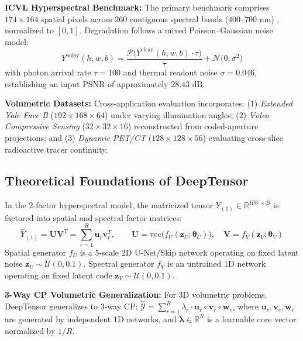 \textbf{ICVL Hyperspectral Benchmark:} The primary benchmark comprises $174 \times 164$ spatial pixels across $260$ contiguous spectral bands ($400\text{--}700\text{ nm}$) \citep{arad2016sparse}, normalized to $[0, 1]$. Degradation follows a mixed Poisson--Gaussian noise model:
\begin{equation}
\label{eq:noise_model}
Y^\text{noisy}(h, w, b) = \frac{\mathcal{P}\big(Y^\text{clean}(h, w, b) \cdot \tau\big)}{\tau} + \mathcal{N}\big(0, \sigma^2\big)
\end{equation}
with photon arrival rate $\tau = 100$ and thermal readout noise $\sigma = 0.046$, establishing an input PSNR of approximately $28.43\text{ dB}$.

\textbf{Volumetric Datasets:} Cross-application evaluation incorporates: (1) \textit{Extended Yale Face B} ($192 \times 168 \times 64$) under varying illumination angles; (2) \textit{Video Compressive Sensing} ($32 \times 32 \times 16$) reconstructed from coded-aperture projections; and (3) \textit{Dynamic PET/CT} ($128 \times 128 \times 56$) evaluating cross-slice radioactive tracer continuity.

\subsection{Theoretical Foundations of DeepTensor}
\label{subsec:deeptensor_foundations}
In the 2-factor hyperspectral model, the matricized tensor $Y_{(1)} \in \mathbb{R}^{HW \times B}$ is factored into spatial and spectral factor matrices:
\begin{equation}
\hat{Y}_{(1)} = \mathbf{U} \mathbf{V}^T = \sum_{r=1}^R \mathbf{u}_r \mathbf{v}_r^T, \qquad \mathbf{U} = \text{vec}\big(f_U(\mathbf{z}_U; \boldsymbol{\theta}_U)\big), \quad \mathbf{V} = f_V(\mathbf{z}_V; \boldsymbol{\theta}_V)
\end{equation}
Spatial generator $f_U$ is a 5-scale 2D U-Net/Skip network operating on fixed latent noise $\mathbf{z}_U \sim \mathcal{U}(0, 0.1)$. Spectral generator $f_V$ is an untrained 1D network operating on fixed latent code $\mathbf{z}_V \sim \mathcal{U}(0, 0.1)$.

\textbf{3-Way CP Volumetric Generalization:} For 3D volumetric problems, DeepTensor generalizes to 3-way CP: $\hat{\mathcal{Y}} = \sum_{r=1}^R \lambda_r \cdot \mathbf{u}_r \circ \mathbf{v}_r \circ \mathbf{w}_r$, where $\mathbf{u}_r, \mathbf{v}_r, \mathbf{w}_r$ are generated by independent 1D networks, and $\boldsymbol{\lambda} \in \mathbb{R}^R$ is a learnable core vector normalized by $1/R$.

